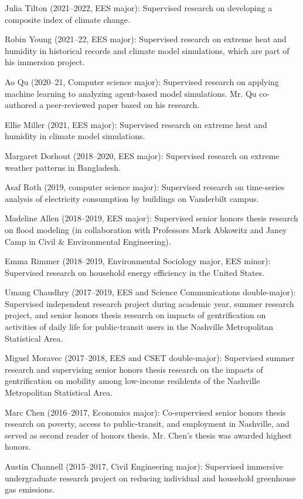 \item Julia Tilton (2021--2022, EES major): Supervised research on developing
a composite index of climate change.
\item Robin Young (2021--22, EES major): Supervised research on extreme heat
and humidity in historical records and climate model simulations, which are
part of his immersion project.
\item Ao Qu (2020--21, Computer science major): Supervised research on applying
machine learning to analyzing agent-based model simulations. Mr. Qu co-authored
a peer-reviewed paper based on his research.
\item Ellie Miller (2021, EES major): Supervised research on extreme heat and
humidity in climate model simulations.
\item Margaret Dorhout (2018--2020, EES major): Supervised research on extreme weather patterns in Bangladesh.
\item Asaf Roth (2019, computer science major): Supervised research on time-series analysis of electricity consumption by buildings on Vanderbilt campus.
\item Madeline Allen (2018--2019, EES major): Supervised senior honors thesis research on flood modeling (in collaboration with Professors Mark Abkowitz and Janey Camp in Civil \& Environmental Engineering).
\item Emma Rimmer (2018--2019, Environmental Sociology major, EES minor): Supervised research on household energy efficiency in the United States.
\item Umang Chaudhry (2017--2019, EES and Science Communications double-major): Supervised independent research project during academic year, summer research project, and senior honors thesis research on impacts of gentrification on activities of daily life
for public-transit users in the Nashville Metropolitan Statistical Area.
\item Miguel Moravec (2017--2018, EES and CSET double-major): Supervised summer research and supervising senior honors thesis research on the impacts of gentrification on mobility among low-income resildents of the Nashville Metropolitan Statistical Area.
\item Marc Chen (2016--2017, Economics major): Co-supervised senior honors thesis research on poverty, access to public-transit, and employment in Nashville, and served as second reader of honors thesis. Mr. Chen's thesis was awarded highest honors.
\item Austin Channell (2015--2017, Civil Engineering major): Supervised immersive undergraduate research project on reducing individual and household greenhouse gas emissions.
